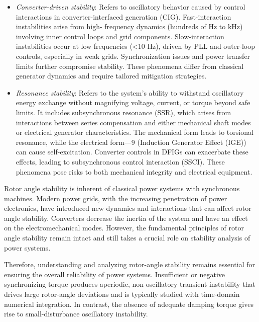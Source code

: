   
\begin{itemize}
    \item \textit{Converter-driven stability}: Refers to oscillatory behavior caused by control interactions in converter-interfaced generation (CIG). 
    Fast-interaction instabilities arise from high- frequency dynamics (hundreds of Hz to kHz) involving inner control loops and grid components. 
    Slow-interaction instabilities occur at low frequencies (<10 Hz), driven by PLL and outer-loop controls, especially 
    in weak grids. Synchronization issues and power transfer limits further compromise stability. 
    These phenomena differ from classical generator dynamics and require tailored mitigation strategies.
    \item \textit{Resonance stability}: Refers to the system's ability to withstand oscillatory 
    energy exchange without magnifying voltage, current, or torque beyond safe limits. It includes subsynchronous 
    resonance (SSR), which arises from interactions between series compensation and either mechanical shaft modes or 
    electrical generator characteristics. The mechanical form leads to torsional resonance, while the electrical 
    form—9 (Induction Generator Effect (IGE)) can cause self-excitation. Converter controls in DFIGs can exacerbate these 
    effects, leading to subsynchronous control interaction (SSCI). These phenomena pose risks to both mechanical integrity 
    and electrical equipment.
\end{itemize}


Rotor angle stability is inherent of classical power systems with synchronous machines. Modern power grids, with the increasing penetration of 
power electronics, have introduced new dynamics and interactions that can affect rotor angle stability. Converters decrease the inertia of the system
and have an effect on the electromechanical modes. However, the fundamental principles of rotor angle stability remain intact and still takes
a crucial role on stability analysis of power systems.

Therefore, understanding and analyzing rotor-angle stability remains essential for ensuring the overall reliability of power systems. 
Insufficient or negative synchronizing torque produces aperiodic, non-oscillatory transient instability that drives large rotor-angle deviations
and is typically studied with time-domain numerical integration. In contrast, the absence of adequate damping torque gives rise to small-disturbance
oscillatory instability.

